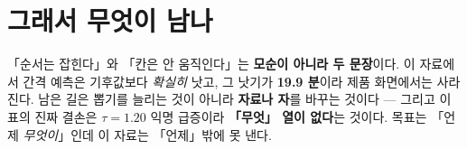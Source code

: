 \documentclass{article}
\begin{document}
\section{그래서 무엇이 남나}

「순서는 잡힌다」와 「칸은 안 움직인다」는 \textbf{모순이 아니라 두 문장}이다.
이 자료에서 간격 예측은 기후값보다 \emph{확실히} 낫고, 그 낫기가 \textbf{19.9 분}이라
제품 화면에서는 사라진다. 남은 길은 뽑기를 늘리는 것이 아니라 \textbf{자료나 자}를 바꾸는 것이다 ---
그리고 이 표의 진짜 결손은 $\tau=1.20$ 익명 급증이라 \textbf{「무엇」 열이 없다}는 것이다.
목표는 「언제 \emph{무엇이}」인데 이 자료는 「언제」밖에 못 낸다.
\end{document}
